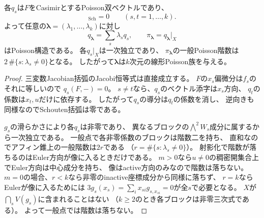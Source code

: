 \begin{proposition}
\label{prop:pg-ad-compatible}
各$q_s$は$F$をCasimirとするPoisson双ベクトルであり、
\begin{equation}
 [q_s,q_t]_{\mathrm{Sch}}=0\qquad(s,t=1,\dots,k).
\end{equation}
よって任意の$\boldsymbol\lambda=(\lambda_1,\ldots,\lambda_k)$に対し
\begin{equation}
 q_{\boldsymbol\lambda}=\sum_s\lambda_s q_s,\qquad
 \pi_{\boldsymbol\lambda}=q_{\boldsymbol\lambda}|_X
\end{equation}
はPoisson構造である。
各$q_s|_X$は一次独立であり、
$\pi_{\boldsymbol\lambda}$の一般Poisson階数は
$2\,\#\{s:\lambda_s\ne0\}$となる。
したがって$\boldsymbol\lambda$は$k$次元の線形Poisson族を与える。
\end{proposition}
\begin{proof}
三変数Jacobian括弧のJacobi恒等式は直接成立する。
$F$の$x_s$偏微分は$f_s$のそれに等しいので
$q_s(F,-)=0$。
$s\ne t$なら、$q_s$のベクトル添字は$x_s$方向、
$q_t$の係数は$x_t,u$だけに依存する。
したがって$q_s$の導分は$q_t$の係数を消し、
逆向きも同様なのでSchouten括弧は零である。

$g_s$の滑らかさにより各$q_s$は非零であり、
異なるブロックの$\bigwedge^2W_s$成分に属するから一次独立である。
一般点で各非零係数のブロックは階数二を持ち、
直和なのでアフィン錐上の一般階数は$2r$である
（$r=\#\{s:\lambda_s\ne0\}$）。
射影化で階数が落ちるのはEuler方向が像に入るときだけである。
$m>0$なら$u\ne0$の稠密開集合上でEuler方向は中心成分を持ち、
像はactive方向のみなので階数は落ちない。
$m=0$の場合、$r<k$なら非零のinactive座標成分から同様に落ちず、
$r=k$ならEulerが像に入るためには
$3g_s(x_s)=\sum_i x_{si}g_{s,x_{si}}=0$が全$s$で必要となる。
$X$が$\bigcap_sV(g_s)$に含まれることはない
（$k\ge2$のとき各ブロックは非零三次式である）。
よって一般点では階数は落ちない。
\end{proof}

